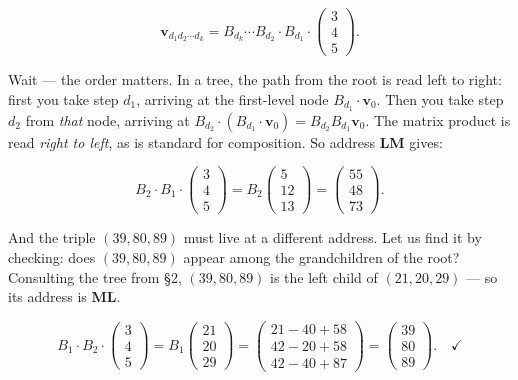 \documentclass[12pt, letterpaper, openany]{book}
\theoremstyle{definition}
\theoremstyle{remark}
\begin{document}
\[
\mathbf{v}_{d_1 d_2 \cdots d_k} = B_{d_k} \cdots B_{d_2} \cdot B_{d_1} \cdot \begin{pmatrix} 3 \\ 4 \\ 5 \end{pmatrix}.
\]

Wait --- the order matters. In a tree, the path from the root is read left to right: first you take step $d_1$, arriving at the first-level node $B_{d_1} \cdot \mathbf{v}_0$. Then you take step $d_2$ from \textit{that} node, arriving at $B_{d_2} \cdot (B_{d_1} \cdot \mathbf{v}_0) = B_{d_2} B_{d_1} \mathbf{v}_0$. The matrix product is read \textit{right to left}, as is standard for composition. So address \textbf{LM} gives:

\[
B_2 \cdot B_1 \cdot \begin{pmatrix} 3 \\ 4 \\ 5 \end{pmatrix} = B_2 \begin{pmatrix} 5 \\ 12 \\ 13 \end{pmatrix} = \begin{pmatrix} 55 \\ 48 \\ 73 \end{pmatrix}.
\]

And the triple $(39, 80, 89)$ must live at a different address. Let us find it by checking: does $(39, 80, 89)$ appear among the grandchildren of the root? Consulting the tree from §2, $(39, 80, 89)$ is the left child of $(21, 20, 29)$ --- so its address is \textbf{ML}.

\[
B_1 \cdot B_2 \cdot \begin{pmatrix} 3 \\ 4 \\ 5 \end{pmatrix} = B_1 \begin{pmatrix} 21 \\ 20 \\ 29 \end{pmatrix} = \begin{pmatrix} 21 - 40 + 58 \\ 42 - 20 + 58 \\ 42 - 40 + 87 \end{pmatrix} = \begin{pmatrix} 39 \\ 80 \\ 89 \end{pmatrix}. \quad \checkmark
\]
\end{document}
